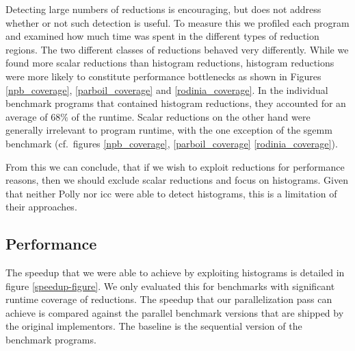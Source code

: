 Detecting large numbers of reductions is encouraging, but does not
address whether or not such detection is useful. To measure this we
profiled each program  and examined how much time was spent in the
different types of reduction regions.  The two different classes of
reductions behaved very differently.  While we found  more scalar
reductions than histogram reductions, histogram reductions were 
more likely to constitute performance bottlenecks as shown in Figures \ref{npb_coverage}, \ref{parboil_coverage} and  \ref{rodinia_coverage}.
In the individual benchmark programs that contained histogram reductions, they accounted for an average of $68\%$ of the
runtime.
Scalar reductions on the other hand were generally irrelevant to program runtime, with the one exception of the sgemm
benchmark (cf.\ figures \ref{npb_coverage},  \ref{parboil_coverage}    \ref{rodinia_coverage}).

From this we can conclude, that if we wish to exploit reductions for
performance reasons, then we should exclude scalar reductions and
focus on histograms.  Given that neither Polly nor icc were able to
detect histograms, this is a limitation of their approaches.


\subsection{Performance}


The speedup that we were able to achieve by exploiting histograms is detailed in
figure \ref{speedup-figure}.  We only evaluated this for benchmarks
with significant runtime coverage of reductions.  The speedup that our
parallelization pass can achieve is compared against the parallel
benchmark versions that are shipped by the original implementors.  The
baseline is the sequential version of the benchmark programs.


